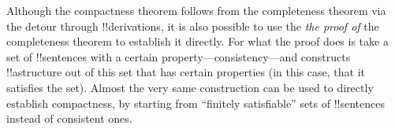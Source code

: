 \documentclass[../../../include/open-logic-section]{subfiles}
\begin{document}
Although the compactness theorem follows from the completeness theorem
via the detour through !!{derivation}s, it is also possible to use the
\emph{the proof of} the completeness theorem to establish it
directly. For what the proof does is take a set of !!{sentence}s with
a certain property---consistency---and constructs !!a{structure} out
of this set that has certain properties (in this case, that it
satisfies the set). Almost the very same construction can be used to
directly establish compactness, by starting from ``finitely
satisfiable'' sets of !!{sentence}s instead of consistent ones.
\end{document}
